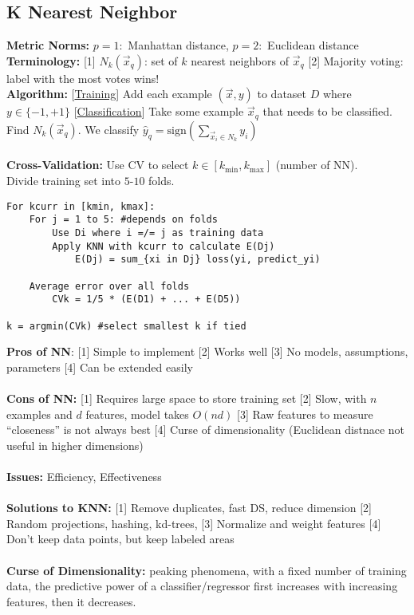 \subsection{K Nearest Neighbor}
\textbf{Metric Norms:} $p=1:$ Manhattan distance, $p=2:$ Euclidean distance\\
\textbf{Terminology:} [1] $N_k(\vec{x}_q)$: set of $k$ nearest neighbors of $\vec{x}_q$ [2] Majority voting: label with the most votes wins!\\
\textbf{Algorithm:} [\underline{Training}] Add each example $(\vec{x},y)$ to dataset $D$ where $y \in \{-1,+1\}$ [\underline{Classification}] Take some example $\vec{x}_q$ that needs to be classified. Find $N_k(\vec{x}_q)$. We classify $\hat{y}_q = \text{sign}(\sum_{\vec{x}_i \in N_k} y_i)$ \\
\\
\textbf{Cross-Validation:} Use CV to select $k \in [k_{\min},k_{\max}]$ (number of NN). \\Divide training set into $5$-$10$ folds.
\begin{lstlisting}
For kcurr in [kmin, kmax]:
    For j = 1 to 5: #depends on folds
        Use Di where i =/= j as training data
        Apply KNN with kcurr to calculate E(Dj)
            E(Dj) = sum_{xi in Dj} loss(yi, predict_yi)
            
    Average error over all folds
        CVk = 1/5 * (E(D1) + ... + E(D5))

k = argmin(CVk) #select smallest k if tied
\end{lstlisting}
\textbf{Pros of NN}: [1] Simple to implement [2] Works well [3] No models, assumptions, parameters [4] Can be extended easily \\
\\
\textbf{Cons of NN:} [1] Requires large space to store training set [2] Slow, with $n$ examples and $d$ features, model takes $O(nd)$ [3] Raw features to measure ``closeness'' is not always best [4] Curse of dimensionality (Euclidean distnace not useful in higher dimensions)\\
\\
\textbf{Issues:} Efficiency, Effectiveness\\
\\
\textbf{Solutions to KNN:} [1] Remove duplicates, fast DS, reduce dimension [2] Random projections, hashing, kd-trees, [3] Normalize and weight features [4] Don't keep data points, but keep labeled areas \\
\\
\textbf{Curse of Dimensionality:} peaking phenomena, with a fixed number of training data, the predictive power of a classifier/regressor first increases with increasing features, then it decreases. 
